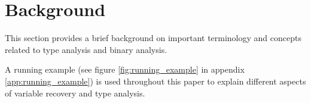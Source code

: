 
\section{Background}

This section provides a brief background on important terminology and concepts related to type analysis and binary analysis.

A running example (see figure \ref{fig:running_example} in appendix \ref{app:running_example}) is used throughout this paper to explain different aspects of variable recovery and type analysis.








